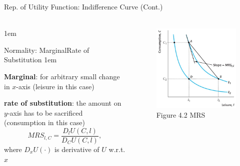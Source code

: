 \documentclass[11pt,aspectratio=43]{beamer}
\newcommand{\jump}[2]{\hyperlink{#1}{\beamerbutton{#2}}}
\let\olditemize=\itemize
\let\endolditemize=\enditemize
\renewenvironment{itemize}{\olditemize \itemsep1em}{\endolditemize}
\theoremstyle{definition}
\begin{document}
\begin{frame}{Rep. of Utility Function: Indifference Curve (Cont.)}
\label{slide:Rep_of_Utility_Function__Indifference_Curve__Cont__}
\framesubtitle{\jump{slide:Note_on_Calculus}{Calculus}}
    \begin{columns}
        \begin{column}{0.5\textwidth}
            \begin{itemize}
                \item \alert{Normality}: M{\tiny arginal}R{\tiny ate of }S{\tiny ubstitution}
                \begin{itemize}
                    \item \textbf{Marginal}: for \alert{arbitrary small} change in $ x $-axis (leisure in this case)
                    \item \textbf{rate of substitution}: the amount on $ y $-axis has to be sacrificed (consumption in this case)
                \end{itemize}
                \begin{equation}
                \label{eq:MRS}
                    MRS_{l, C} = \frac{D_{l} U( C, l )}{D_{C}U( C, l )}
                ,\end{equation}
                where $ D_{x}U( \cdot ) $ is derivative of $ U $ w.r.t. $ x $
            \end{itemize}
        \end{column}
        \begin{column}{0.5\textwidth}
        \begin{figure}
            \caption{Figure 4.2 MRS}
            \includegraphics[width=\textwidth]{./figures/Figure4_2.jpg}
        \end{figure}
        \end{column}
    \end{columns}
\end{frame}
\end{document}
